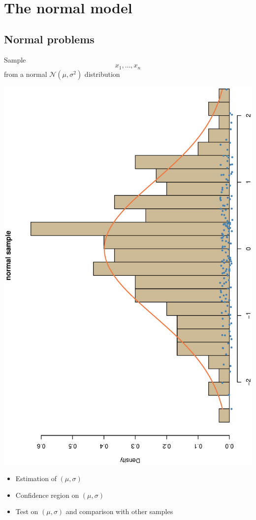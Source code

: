 \section{The normal model}
\begin{slide}
\tableofcontents[sectionstyle=show/hide,subsectionstyle=show/shaded/hide]

\end{slide}
\subsection{Normal problems}\begin{slide}
Sample
$$
x_1,\ldots,x_n
$$
from a normal $\mathcal{N}(\mu,\sigma^2)$ distribution

\centerline{\includegraphics[height=\textwidth,width=5truecm,angle=270]{figures/normalsample.ps}}

\end{slide}\begin{slide}

\begin{itemize}
\item Estimation of \RedOrange{[transforms of]} $(\mu,\sigma)$ 
\pause
\item Confidence region \RedOrange{[interval]} on $(\mu,\sigma)$
\pause
\item Test on $(\mu,\sigma)$ and comparison with other samples
\end{itemize}

\end{slide}
